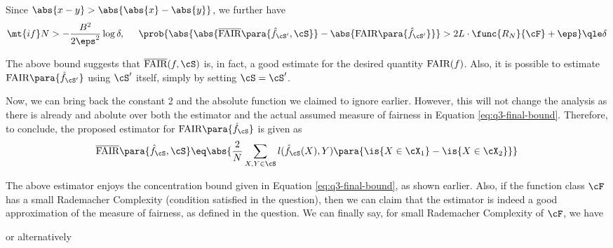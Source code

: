 \documentclass[a4paper,10pt]{article}
\begin{document}
\begin{question}
	Since $\abs{x - y} > \abs{\abs{x} - \abs{y}}$, we further have
	\begin{equation}
		\mt{if} N > - \frac{B^2}{2 \eps^2} \log{\delta}, \hspace{5mm} \prob{\abs{\abs{\overline{\text{FAIR}}\para{\hat{f}_{\cS'}, \cS}} - \abs{\text{FAIR}\para{\hat{f}_{\cS'}}}} > 2L \cdot \func{R_N}{\cF} + \eps}	\qle	\delta
		\label{eq:q3-final-bound}
	\end{equation}

	The above bound suggests that $\fairs$ is, in fact, a good estimate for the desired quantity $\text{FAIR}(f)$. Also, it is possible to estimate $\text{FAIR}\para{\hat{f}_{\cS'}}$ using $\cS'$ itself, simply by setting $\cS = \cS'$.

	Now, we can bring back the constant 2 and the absolute function we claimed to ignore earlier. However, this will not change the analysis as there is already and abolute over both the estimator and the actual assumed measure of fairness in Equation \ref{eq:q3-final-bound}. Therefore, to conclude, the proposed estimator for $\text{FAIR}\para{\hat{f}_\cS}$ is given as
	\begin{align*}
		\overline{\text{FAIR}}\para{\hat{f}_\cS, \cS}	\eq	\abs{\frac{2}{N} \sum_{X, Y \in \cS} l(\hat{f}_{\cS}(X), Y) \para{\is{X \in \cX_1} - \is{X \in \cX_2}}}
	\end{align*}

	The above estimator enjoys the concentration bound given in Equation \ref{eq:q3-final-bound}, as shown earlier. Also, if the function class $\cF$ has a small Rademacher Complexity (condition satisfied in the question), then we can claim that the estimator is indeed a good approximation of the measure of fairness, as defined in the question. We can finally say, for small Rademacher Complexity of $\cF$, we have
	\begin{tightcenter}
		or alternatively
	\end{tightcenter}
\end{question}
\end{document}
